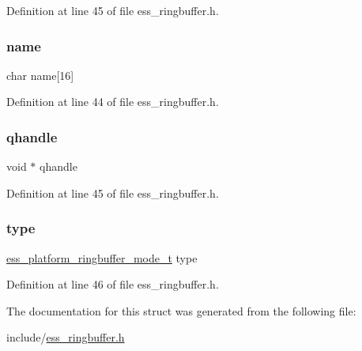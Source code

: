 Definition at line 45 of file ess\+\_\+ringbuffer.\+h.

\mbox{\label{structess__platform__ringbuffer_acd328517a6cf718155c2e6e22b671ca9}} 
\subsubsection{\texorpdfstring{name}{name}}
{\footnotesize\ttfamily char name\mbox{[}16\mbox{]}}



Definition at line 44 of file ess\+\_\+ringbuffer.\+h.

\mbox{\label{structess__platform__ringbuffer_a011a9cee6c81e61319318a9a5776db28}} 
\subsubsection{\texorpdfstring{qhandle}{qhandle}}
{\footnotesize\ttfamily void $\ast$ qhandle}



Definition at line 45 of file ess\+\_\+ringbuffer.\+h.

\mbox{\label{structess__platform__ringbuffer_a6d72e7e7d09fd9b2363d51f2e6c408f5}} 
\subsubsection{\texorpdfstring{type}{type}}
{\footnotesize\ttfamily \hyperlink{ess__ringbuffer_8h_a80a1652a42f77e9a51f3e45c7da84396}{ess\+\_\+platform\+\_\+ringbuffer\+\_\+mode\+\_\+t} type}



Definition at line 46 of file ess\+\_\+ringbuffer.\+h.



The documentation for this struct was generated from the following file\+:\begin{DoxyCompactItemize}
\item 
include/\hyperlink{ess__ringbuffer_8h}{ess\+\_\+ringbuffer.\+h}\end{DoxyCompactItemize}
